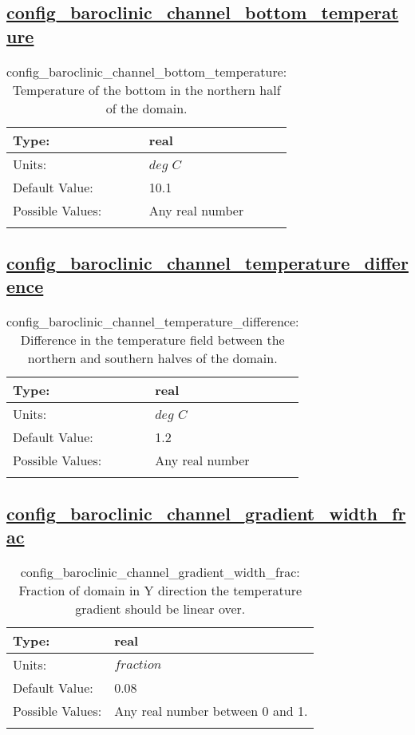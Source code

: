 \subsection[config\_baroclinic\_channel\_bottom\_temperature]{\hyperref[sec:nm_tab_baroclinic_channel]{config\_baroclinic\_channel\_bottom\_temperature}}
\label{subsec:nm_sec_config_baroclinic_channel_bottom_temperature}
\begin{center}
\begin{longtable}{| p{2.0in} || p{4.0in} |}
    \hline
    Type: & real \\
    \hline
    Units: & $deg$ $C$ \\
    \hline
    Default Value: & 10.1 \\
    \hline
    Possible Values: & Any real number \\
    \hline
    \caption{config\_baroclinic\_channel\_bottom\_temperature: Temperature of the bottom in the northern half of the domain.}
\end{longtable}
\end{center}
\subsection[config\_baroclinic\_channel\_temperature\_difference]{\hyperref[sec:nm_tab_baroclinic_channel]{config\_baroclinic\_channel\_temperature\_difference}}
\label{subsec:nm_sec_config_baroclinic_channel_temperature_difference}
\begin{center}
\begin{longtable}{| p{2.0in} || p{4.0in} |}
    \hline
    Type: & real \\
    \hline
    Units: & $deg$ $C$ \\
    \hline
    Default Value: & 1.2 \\
    \hline
    Possible Values: & Any real number \\
    \hline
    \caption{config\_baroclinic\_channel\_temperature\_difference: Difference in the temperature field between the northern and southern halves of the domain.}
\end{longtable}
\end{center}
\subsection[config\_baroclinic\_channel\_gradient\_width\_frac]{\hyperref[sec:nm_tab_baroclinic_channel]{config\_baroclinic\_channel\_gradient\_width\_frac}}
\label{subsec:nm_sec_config_baroclinic_channel_gradient_width_frac}
\begin{center}
\begin{longtable}{| p{2.0in} || p{4.0in} |}
    \hline
    Type: & real \\
    \hline
    Units: & $fraction$ \\
    \hline
    Default Value: & 0.08 \\
    \hline
    Possible Values: & Any real number between 0 and 1. \\
    \hline
    \caption{config\_baroclinic\_channel\_gradient\_width\_frac: Fraction of domain in Y direction the temperature gradient should be linear over.}
\end{longtable}
\end{center}
